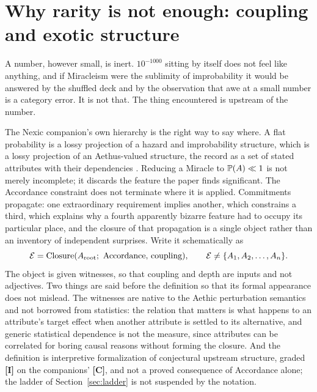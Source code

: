 \section{Why rarity is not enough: coupling and exotic structure}\label{sec:exotic}

A number, however small, is inert. $10^{-1000}$ sitting by itself does
not feel like anything, and if Miracleism were the sublimity of
improbability it would be answered by the shuffled deck and by the
observation that awe at a small number is a category error. It is not
that. The thing encountered is upstream of the number.

The Nexic companion's own hierarchy is the right way to say where. A
flat probability is a lossy projection of a hazard and improbability
structure, which is a lossy projection of an Aethus-valued structure,
the record as a set of stated attributes with their dependencies
\cite{Nexus,Aethus}. Reducing a Miracle to $\mathbb{P}(A)\ll1$ is not merely
incomplete; it discards the feature the paper finds significant. The
Accordance constraint does not terminate where it is applied.
Commitments propagate: one extraordinary requirement implies another,
which constrains a third, which explains why a fourth apparently bizarre
feature had to occupy its particular place, and the closure of that
propagation is a single object rather than an inventory of independent
surprises. Write it schematically as
\[
\Ec=\operatorname{Closure}(A_{\mathrm{root}};\ \text{Accordance, coupling}),
\qquad
\Ec\neq\{A_1,A_2,\dots,A_n\}.
\]
The object is given witnesses, so that coupling and depth are inputs
and not adjectives. Two things are said before the definition so that
its formal appearance does not mislead. The witnesses are native to the
Aethic perturbation semantics and not borrowed from statistics: the
relation that matters is what happens to an attribute's target effect
when another attribute is settled to its alternative, and generic
statistical dependence is not the measure, since attributes can be
correlated for boring causal reasons without forming the closure. And
the definition is interpretive formalization of conjectural upstream
structure, graded \textbf{[I]} on the companions' \textbf{[C]}, and not a
proved consequence of Accordance alone; the ladder of
Section~\ref{sec:ladder} is not suspended by the notation.

